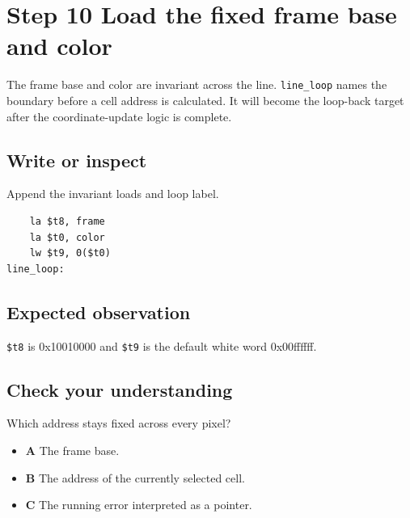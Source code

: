 \section{Step 10 Load the fixed frame base and
  color}\label{007-bresenham-line-s10-step-10-load-the-fixed-frame-base-and-color}

The frame base and color are invariant across the line.
\texttt{line\_loop} names the boundary before a cell address is
calculated. It will become the loop-back target after the
coordinate-update logic is complete.

\subsection{Write or
  inspect}\label{007-bresenham-line-s10-write-or-inspect}

Append the invariant loads and loop label.

\begin{verbatim}
    la $t8, frame
    la $t0, color
    lw $t9, 0($t0)
line_loop:
\end{verbatim}

\subsection{Expected
  observation}\label{007-bresenham-line-s10-expected-observation}

\texttt{\$t8} is 0x10010000 and \texttt{\$t9} is the default white word
0x00ffffff.

\subsection{Check your
  understanding}\label{007-bresenham-line-s10-check-your-understanding}

Which address stays fixed across every pixel?

\begin{itemize}
  \tightlist
  \item
        \textbf{A} The frame base.
  \item
        \textbf{B} The address of the currently selected cell.
  \item
        \textbf{C} The running error interpreted as a pointer.
\end{itemize}
